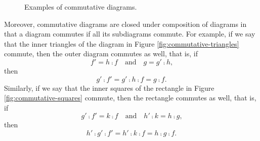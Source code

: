 \begin{definition}
\begin{figure}[htbp]
\begin{subfigure}{0.5\linewidth}
\begin{center}
      \end{center}
      \caption{}
      \label{fig:commutative-square}
    \end{subfigure}
    \caption{Examples of commutative diagrams.}
    \label{fig:commutative-diagram}
  \end{figure}

\end{definition}

\begin{remark}



  \label{re:commutative-diagram}

  Moreover, commutative diagrams are closed under composition of
  diagrams in that a diagram commutes if all its subdiagrams commute.
  For example, if we say that the inner triangles of the diagram in
  Figure \ref{fig:commutative-triangles} commute, then the outer
  diagram commutes as well, that is, if
  \begin{equation*}
    f' = h \comp f
    \quad
    \text{and}
    \quad
    g = g' \comp h
    \text{,}
  \end{equation*}
  then
  \begin{equation*}
    g' \comp f' = g' \comp h \comp f = g \comp f
    \text{.}
  \end{equation*}
  Similarly, if we say that the inner squares of the rectangle in
  Figure \ref{fig:commutative-squares} commute, then the rectangle
  commutes as well, that is, if
  \begin{equation*}
    g' \comp f' = k \comp f
    \quad
    \text{and}
    \quad
    h' \comp k = h \comp g
    \text{,}
  \end{equation*}
  then
  \begin{equation*}
    h' \comp g' \comp f' = h' \comp k \comp f = h \comp g \comp f
    \text{.}
  \end{equation*}

  \begin{figure}[htbp]
    \begin{subfigure}{0.5\linewidth}
      \begin{center}
\end{center}
\end{subfigure}
\end{figure}
\end{remark}
